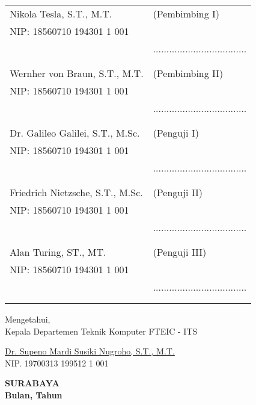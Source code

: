     \noindent
    \begin{tabularx}{\textwidth}{X l}
      Nikola Tesla, S.T., M.T.          & (Pembimbing I) \\
      NIP: 18560710 194301 1 001        & \\
      & ................................... \\
      &  \\
      &  \\
      Wernher von Braun, S.T., M.T.     & (Pembimbing II) \\
      NIP: 18560710 194301 1 001        & \\
      & ................................... \\
      &  \\
      &  \\
      Dr. Galileo Galilei, S.T., M.Sc.  & (Penguji I) \\
      NIP: 18560710 194301 1 001        & \\
      & ................................... \\
      &  \\
      &  \\
      Friedrich Nietzsche, S.T., M.Sc.  & (Penguji II) \\
      NIP: 18560710 194301 1 001        & \\
      & ................................... \\
      &  \\
      &  \\
      Alan Turing, ST., MT.             & (Penguji III) \\
      NIP: 18560710 194301 1 001        & \\
      & ................................... \\
      &  \\
      &  \\
    \end{tabularx}
  \endgroup


  \begin{center}
    Mengetahui, \\
    Kepala Departemen Teknik Komputer FTEIC - ITS\\

    \vspace{8ex}

    \underline{Dr. Supeno Mardi Susiki Nugroho, S.T., M.T.} \\
    NIP. 19700313 199512 1 001
  \end{center}

  \begin{center}
    \textbf{SURABAYA\\Bulan, Tahun}
  \end{center}
\endgroup
